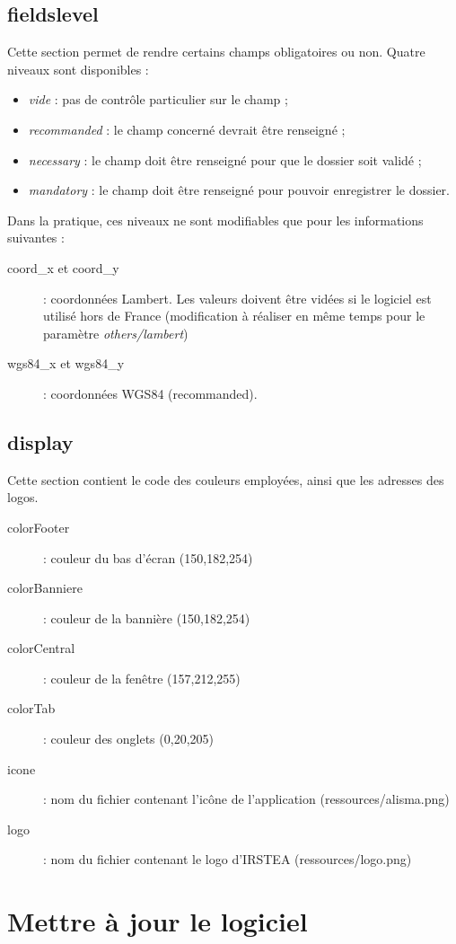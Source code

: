 \subsection{fieldslevel}
Cette section permet de rendre certains champs obligatoires ou non. Quatre niveaux sont disponibles :
\begin{itemize}
\item \textit{vide} : pas de contrôle particulier sur le champ ;
\item \textit{recommanded} : le champ concerné devrait être renseigné ;
\item \textit{necessary} : le champ doit être renseigné pour que le dossier soit validé ;
\item \textit{mandatory} : le champ doit être renseigné pour pouvoir enregistrer le dossier.
\end{itemize}

Dans la pratique, ces niveaux ne sont modifiables que pour les informations suivantes :
\begin{description}
\item [coord\_x et coord\_y] : coordonnées Lambert. Les valeurs doivent être vidées si le logiciel est utilisé hors de France (modification à réaliser en même temps pour le paramètre \textit{others/lambert}) 
\item [wgs84\_x et wgs84\_y] : coordonnées WGS84 (recommanded).
\end{description}

\subsection{display}
Cette section contient le code des couleurs employées, ainsi que les adresses des logos.
\begin{description}
\item [colorFooter] : couleur du bas d'écran (150,182,254)
\item [colorBanniere] : couleur de la bannière (150,182,254)
\item [colorCentral] : couleur de la fenêtre (157,212,255)
\item [colorTab] : couleur des onglets (0,20,205)
\item [icone] : nom du fichier contenant l'icône de l'application (ressources/alisma.png)
\item [logo] : nom du fichier contenant le logo d'IRSTEA (ressources/logo.png)
\end{description}

\section{Mettre à jour le logiciel}


